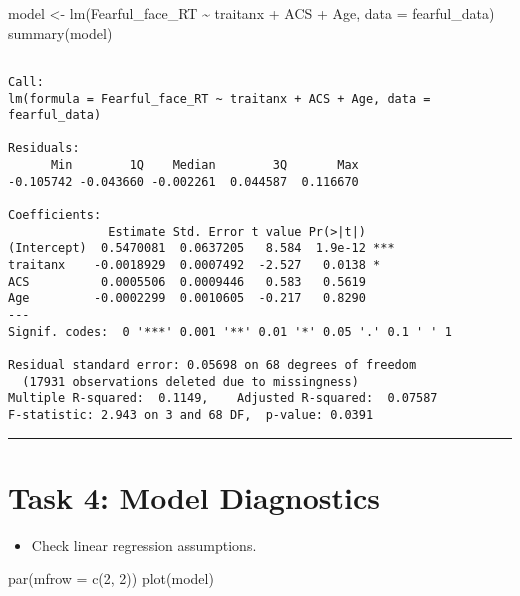 \documentclass[
  letterpaper,
  DIV=11,
  numbers=noendperiod]{scrreprt}
\newenvironment{Shaded}{\begin{snugshade}}{\end{snugshade}}
\newcommand{\AttributeTok}[1]{\textcolor[rgb]{0.40,0.45,0.13}{#1}}
\newcommand{\DecValTok}[1]{\textcolor[rgb]{0.68,0.00,0.00}{#1}}
\newcommand{\FunctionTok}[1]{\textcolor[rgb]{0.28,0.35,0.67}{#1}}
\newcommand{\NormalTok}[1]{\textcolor[rgb]{0.00,0.23,0.31}{#1}}
\newcommand{\OtherTok}[1]{\textcolor[rgb]{0.00,0.23,0.31}{#1}}
\newcommand{\SpecialCharTok}[1]{\textcolor[rgb]{0.37,0.37,0.37}{#1}}
\providecommand{\tightlist}{%
  \setlength{\itemsep}{0pt}\setlength{\parskip}{0pt}}\usepackage{longtable,booktabs,array}
\begin{document}
\begin{Shaded}
\begin{Highlighting}[]
\NormalTok{model }\OtherTok{\textless{}{-}} \FunctionTok{lm}\NormalTok{(Fearful\_face\_RT }\SpecialCharTok{\textasciitilde{}}\NormalTok{ traitanx }\SpecialCharTok{+}\NormalTok{ ACS }\SpecialCharTok{+}\NormalTok{ Age, }\AttributeTok{data =}\NormalTok{ fearful\_data)}
\FunctionTok{summary}\NormalTok{(model)}
\end{Highlighting}
\end{Shaded}

\begin{verbatim}

Call:
lm(formula = Fearful_face_RT ~ traitanx + ACS + Age, data = fearful_data)

Residuals:
      Min        1Q    Median        3Q       Max 
-0.105742 -0.043660 -0.002261  0.044587  0.116670 

Coefficients:
              Estimate Std. Error t value Pr(>|t|)    
(Intercept)  0.5470081  0.0637205   8.584  1.9e-12 ***
traitanx    -0.0018929  0.0007492  -2.527   0.0138 *  
ACS          0.0005506  0.0009446   0.583   0.5619    
Age         -0.0002299  0.0010605  -0.217   0.8290    
---
Signif. codes:  0 '***' 0.001 '**' 0.01 '*' 0.05 '.' 0.1 ' ' 1

Residual standard error: 0.05698 on 68 degrees of freedom
  (17931 observations deleted due to missingness)
Multiple R-squared:  0.1149,    Adjusted R-squared:  0.07587 
F-statistic: 2.943 on 3 and 68 DF,  p-value: 0.0391
\end{verbatim}

\begin{center}\rule{0.5\linewidth}{0.5pt}\end{center}

\section{Task 4: Model Diagnostics}\label{task-4-model-diagnostics}

\begin{itemize}
\tightlist
\item
  Check linear regression assumptions.
\end{itemize}

\begin{Shaded}
\begin{Highlighting}[]
\FunctionTok{par}\NormalTok{(}\AttributeTok{mfrow =} \FunctionTok{c}\NormalTok{(}\DecValTok{2}\NormalTok{, }\DecValTok{2}\NormalTok{))}
\FunctionTok{plot}\NormalTok{(model)}
\end{Highlighting}
\end{Shaded}
\end{document}
